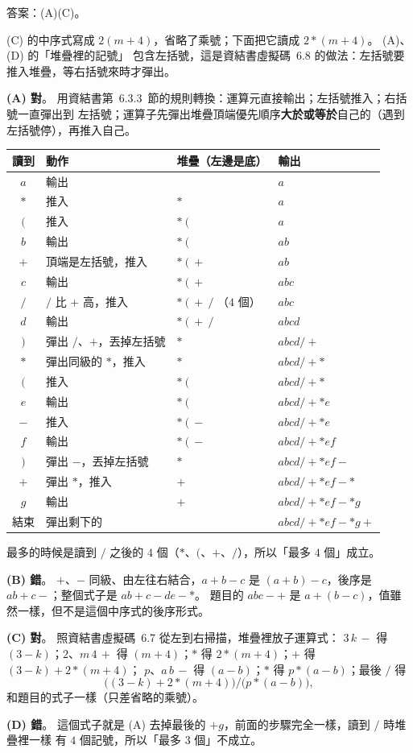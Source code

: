 \begin{pastsoln}
答案：(A)(C)。

(C) 的中序式寫成 $2(m+4)$，省略了乘號；下面把它讀成 $2*(m+4)$。 (A)、(D) 的「堆疊裡的記號」
包含左括號，這是資結書虛擬碼~6.8 的做法：左括號要推入堆疊，等右括號來時才彈出。

\textbf{(A) 對}。 用資結書第~6.3.3~節的規則轉換：運算元直接輸出；左括號推入；右括號一直彈出到
左括號；運算子先彈出堆疊頂端優先順序\textbf{大於或等於}自己的（遇到左括號停），再推入自己。
\begin{center}
\small
\begin{tabular}{clll}
\toprule
讀到 & 動作 & 堆疊（左邊是底） & 輸出 \\
\midrule
$a$ & 輸出 & & $a$ \\
$*$ & 推入 & $*$ & $a$ \\
$($ & 推入 & $*\ ($ & $a$ \\
$b$ & 輸出 & $*\ ($ & $ab$ \\
$+$ & 頂端是左括號，推入 & $*\ (\ +$ & $ab$ \\
$c$ & 輸出 & $*\ (\ +$ & $abc$ \\
$/$ & $/$ 比 $+$ 高，推入 & $*\ (\ +\ /$ \quad（$4$ 個） & $abc$ \\
$d$ & 輸出 & $*\ (\ +\ /$ & $abcd$ \\
$)$ & 彈出 $/$、$+$，丟掉左括號 & $*$ & $abcd/+$ \\
$*$ & 彈出同級的 $*$，推入 & $*$ & $abcd/+*$ \\
$($ & 推入 & $*\ ($ & $abcd/+*$ \\
$e$ & 輸出 & $*\ ($ & $abcd/+*e$ \\
$-$ & 推入 & $*\ (\ -$ & $abcd/+*e$ \\
$f$ & 輸出 & $*\ (\ -$ & $abcd/+*ef$ \\
$)$ & 彈出 $-$，丟掉左括號 & $*$ & $abcd/+*ef-$ \\
$+$ & 彈出 $*$，推入 & $+$ & $abcd/+*ef-*$ \\
$g$ & 輸出 & $+$ & $abcd/+*ef-*g$ \\
結束 & 彈出剩下的 & & $abcd/+*ef-*g+$ \\
\bottomrule
\end{tabular}
\end{center}
最多的時候是讀到 $/$ 之後的 $4$ 個（$*$、$($、$+$、$/$），所以「最多 $4$ 個」成立。

\textbf{(B) 錯}。 $+$、$-$ 同級、由左往右結合，$a+b-c$ 是 $(a+b)-c$，後序是 $ab+c-$；整個式子是
$ab+c-de-*$。 題目的 $abc-+$ 是 $a+(b-c)$，值雖然一樣，但不是這個中序式的後序形式。

\textbf{(C) 對}。 照資結書虛擬碼~6.7 從左到右掃描，堆疊裡放子運算式：
$3\,k\,-$ 得 $(3-k)$；$2$、$m\,4\,+$ 得 $(m+4)$；$*$ 得 $2*(m+4)$；$+$ 得 $(3-k)+2*(m+4)$；
$p$、$a\,b\,-$ 得 $(a-b)$；$*$ 得 $p*(a-b)$；最後 $/$ 得
\[
\bigl((3-k)+2*(m+4)\bigr)/\bigl(p*(a-b)\bigr),
\]
和題目的式子一樣（只差省略的乘號）。

\textbf{(D) 錯}。 這個式子就是 (A) 去掉最後的 $+g$，前面的步驟完全一樣，讀到 $/$ 時堆疊裡一樣
有 $4$ 個記號，所以「最多 $3$ 個」不成立。
\end{pastsoln}
